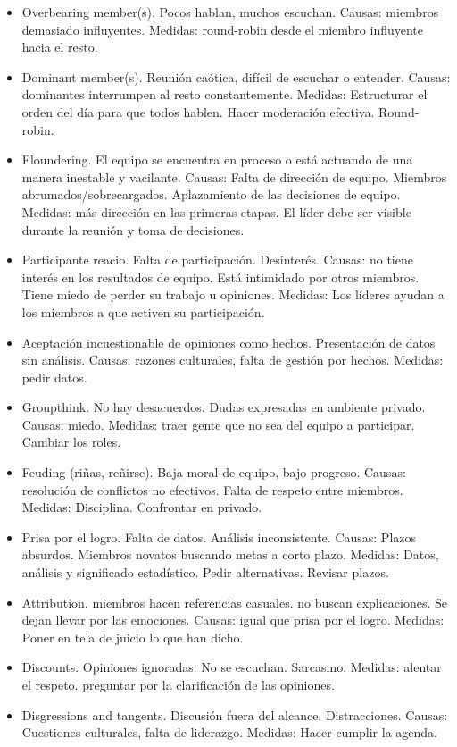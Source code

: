 \documentclass[oneside]{book}
\begin{document}
\begin{itemize}
	\item Overbearing member(s). Pocos hablan, muchos escuchan. Causas: miembros demasiado influyentes. Medidas: round-robin desde el miembro influyente hacia el resto.
	\item Dominant member(s). Reunión caótica, difícil de escuchar o entender. Causas: dominantes interrumpen al resto constantemente. Medidas: Estructurar el orden del día para que todos hablen. Hacer moderación efectiva. Round-robin.
	\item Floundering. El equipo se encuentra en proceso o está actuando de una manera inestable y vacilante. Causas: Falta de dirección de equipo. Miembros abrumados/sobrecargados. Aplazamiento de las decisiones de equipo. Medidas: más dirección en las primeras etapas. El líder debe ser visible durante la reunión y toma de decisiones.
	\item Participante reacio. Falta de participación. Desinterés. Causas: no tiene interés en los resultados de equipo. Está intimidado por otros miembros. Tiene miedo de perder su trabajo u opiniones. Medidas: Los líderes ayudan a los miembros a que activen su participación.
	\item Aceptación incuestionable de opiniones como hechos. Presentación de datos sin análisis. Causas: razones culturales, falta de gestión por hechos. Medidas: pedir datos.
	\item Groupthink. No hay desacuerdos. Dudas expresadas en ambiente privado. Causas: miedo. Medidas: traer gente que no sea del equipo a participar. Cambiar los roles.
	\item Feuding (riñas, reñirse). Baja moral de equipo, bajo progreso. Causas: resolución de conflictos no efectivos. Falta de respeto entre miembros. Medidas: Disciplina. Confrontar en privado. 
	\item Prisa por el logro. Falta de datos. Análisis inconsistente. Causas: Plazos absurdos. Miembros novatos buscando metas a corto plazo. Medidas: Datos, análisis y significado estadístico. Pedir alternativas. Revisar plazos.
	\item Attribution. miembros hacen referencias casuales. no buscan explicaciones. Se dejan llevar por las emociones. Causas: igual que prisa por el logro. Medidas: Poner en tela de juicio lo que han dicho.
	\item Discounts. Opiniones ignoradas. No se escuchan. Sarcasmo. Medidas: alentar el respeto. preguntar por la clarificación de las opiniones.
	\item Disgressions and tangents. Discusión fuera del alcance. Distracciones. Causas: Cuestiones culturales, falta de liderazgo. Medidas: Hacer cumplir la agenda. 
\end{itemize}
\end{document}
